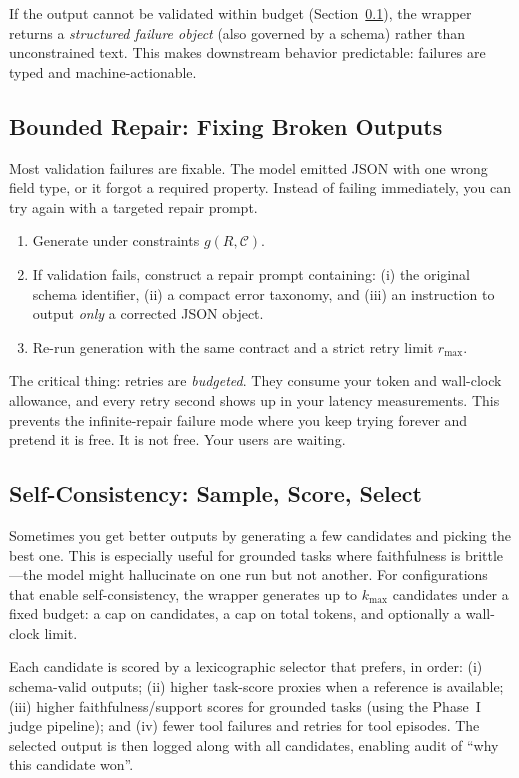 \documentclass[11pt]{article}
\begin{document}
If the output cannot be validated within budget (Section~\ref{sec:method-retry}), the wrapper returns a \emph{structured failure object} (also governed by a schema) rather than unconstrained text.
This makes downstream behavior predictable: failures are typed and machine-actionable.

\subsection{Bounded Repair: Fixing Broken Outputs}
\label{sec:method-retry}

Most validation failures are fixable.
The model emitted JSON with one wrong field type, or it forgot a required property.
Instead of failing immediately, you can try again with a targeted repair prompt.

\begin{enumerate}[leftmargin=12pt]
    \item Generate under constraints $g(R,\mathcal{C})$.
    \item If validation fails, construct a repair prompt containing:
    (i) the original schema identifier,
    (ii) a compact error taxonomy, and
    (iii) an instruction to output \emph{only} a corrected JSON object.
    \item Re-run generation with the same contract and a strict retry limit $r_{\max}$.
\end{enumerate}

The critical thing: retries are \emph{budgeted}.
They consume your token and wall-clock allowance, and every retry second shows up in your latency measurements.
This prevents the infinite-repair failure mode where you keep trying forever and pretend it is free.
It is not free.
Your users are waiting.

\subsection{Self-Consistency: Sample, Score, Select}

Sometimes you get better outputs by generating a few candidates and picking the best one.
This is especially useful for grounded tasks where faithfulness is brittle---the model might hallucinate on one run but not another.
For configurations that enable self-consistency, the wrapper generates up to $k_{\max}$ candidates under a fixed budget: a cap on candidates, a cap on total tokens, and optionally a wall-clock limit.

Each candidate is scored by a lexicographic selector that prefers, in order:
(i) schema-valid outputs;
(ii) higher task-score proxies when a reference is available;
(iii) higher faithfulness/support scores for grounded tasks (using the Phase~I judge pipeline);
and (iv) fewer tool failures and retries for tool episodes.
The selected output is then logged along with all candidates, enabling audit of ``why this candidate won''.
\end{document}
